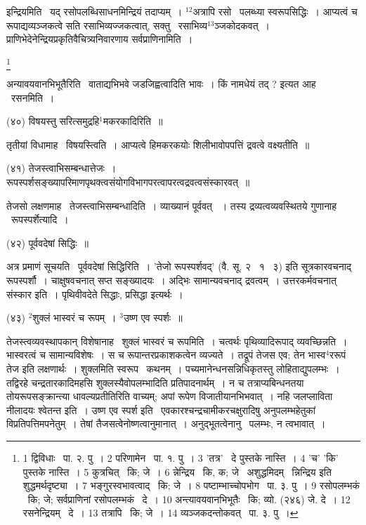 \documentclass[11pt, openany]{book}
\newcommand\blfootnote[1]{%
 \begingroup
 \renewcommand\thefootnote{}\footnote{#1}%
 \addtocounter{footnote}{-1}%
 \endgroup
}
\begin{document}
{\knu इन्द्रियमि}ति  \textendash\ यद् रसोपलब्धिसाधनमिन्द्रियं तदाप्यम्~। ${}^12$अत्रापि रसो \textendash\ पलब्ध्या स्वरूपसिद्धिः~। आप्यत्वं च रूपाद्यव्यञ्जकत्वे सति रसाभिव्यज्जकत्वात्, सक्तु \textendash\ रसाभिव्य$^13$ञ्जकोदकवत्~। प्राणिभेदेनेन्द्रियप्रकृतिवैचित्र्यनिवारणाय {\knu सर्वप्राणिना}मिति~।

\blfootnote{1 द्विविधाः  \textendash\ पा. २. पु~। 2 परिणामेन  \textendash\ पा. १. पु~। 3 'तत्र' \textendash\ दे पुस्तके नास्ति~। 4 'च' 'कि' पुस्तके नास्ति~। 5 कुत्रचित्  \textendash\ कि; जे~। 6 न्नेन्द्रिय \textendash\ कि, क; जे  \textendash\ अशुद्धमिदम्  \textendash\ न्निन्द्रिय इति शुद्धमर्थदृष्ट्या~। 7 भङ्गुरस्वभावत्वाद्  \textendash\ कि; जे~। 8 पष्टाम्भाच्चोपभोग \textendash\ पा. ३. पु~। 9 रसोपलम्भकं \textendash\ कि; जे; सर्वप्राणिनां रसोपलम्भकं  \textendash\ दे~। 10 अन्त्यावयवानभिभूतैः  \textendash\ कि; व्यो. (२४६) जे. दे~। 12 रसनेन्द्रियम्  \textendash\ दे~। 13 तत्रापि  \textendash\ कि; जे~। 14 व्यञ्जकदन्तोकवत्  \textendash\ पा. ३. पु~।}

\newpage
\noindent
अन्या{\knu वयवानभिभूतै}रिति \textendash\ वाताद्यभिभवे जडजिह्वत्वादिति भावः~। किं नामधेयं तद् ? इत्यत आह \textendash\ {\knu रसन}मिति~।

{\knu (४०) विषयस्तु सरित्समुद्रहि$^1$मकरकादिरिति~॥}

तृतीयां विधामाह \textendash\ {\knu विषयस्त्विति}~। आप्यत्वे हिमकरकयोः शिलीभावोपपत्तिं द्रवत्वे वक्ष्यतीति~॥

\hangindent=2cm {\knu (४१) तेजस्त्वाभिसम्बन्धात्तेजः~। रूपस्पर्शसङ्ख्यापरिमाणपृथक्त्वसंयोगविभागपरत्वापरत्वद्रवत्वसंस्कारवत्~॥}

तेजसो लक्षणमाह \textendash\ {\knu तेजस्त्वाभिसम्बन्धा}दिति~। व्याख्यानं पूर्ववत् ~। तस्य द्रव्यत्वव्यवस्थितये गुणानाह \textendash\ रूपस्पर्शेत्यादि~। 

{\knu (४२) पूर्ववदेषां सिद्धिः~॥}

अत्र प्रमाणं सूचयति \textendash\ {\knu पूर्ववदेषां सिद्धि}रिति~। 'तेजो रूपस्पर्शवद्' (वै. सू. २ \textendash\ १ \textendash\ ३) इति सूत्रकारवचनाद् रूपस्पर्शौ~। चाक्षुषवचनात् सप्त सङ्ख्यादयः~। अद्भिः सामान्यवचनाद् द्रवत्वम्~। उत्तरकर्मवचनात् संस्कार इति~। पृथिवीवदेते सिद्धाः, प्रसिद्धा इत्यर्थः~।

{\knu (४३) ${}^2$शुक्लं भास्वरं च रूपम्~। ${}^3$उष्ण एव स्पर्शः~॥}

तेजस्त्वव्यवस्थापकान् विशेषानाह \textendash\ {\knu शुक्लं भास्वरं च रूप}मिति~। चत्वर्थः पृथिव्यादिरूपाद् व्यवच्छिन्नति~। भास्वरत्वं च सामान्यविशेषः~। स च रूपान्तरप्रकाशकत्वेन व्यज्यते~। तद्रूपं तेजस एव; तेन भास्व$^4$ररूपं तेज इति लक्षणार्थः~। शुक्लमिति स्वरूप  \textendash\ कथनम्~। पच्यमानेन्धनसन्निधिकृतस्तु लोहिताद्युपलम्भः~। तद्विरहे चन्द्रतारकादिमहसि शुक्लस्यैवोपलम्भादिति प्रतिपादनार्थम्~। न च तत्राप्यबिन्धनतया तोयरूपसङ्क्रान्त्या धावल्यप्रतीतिरिति वाच्यम्; अपां रूपेण विजातीयानभिभवात्~। नहि जलप्लाविता नीलादयः श्वेतन्त इति~। {\knu उष्ण एव स्पर्श} इति \textendash\ एवकारश्चन्द्रचामीकरचक्षुरादिषु अनुपलम्भहेतुकां विप्रतिपत्तिमपनेतुम्~। तेषां तैजसत्वेनोष्णत्वानुमानात्~। अनुद्भूतत्वेनानु \textendash\ पलम्भः, न त्वभावात्~।
\end{document}

